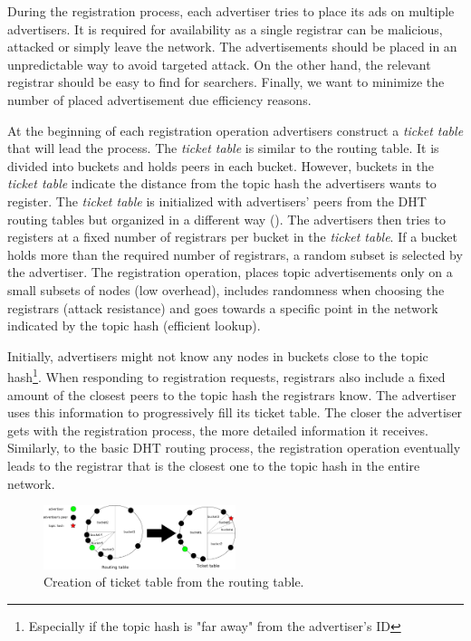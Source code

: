 During the registration process, each advertiser tries to place its ads on multiple advertisers. It is required for availability as a single registrar can be malicious, attacked or simply leave the network. The advertisements should be placed in an unpredictable way to avoid targeted attack. On the other hand, the relevant registrar should be easy to find for searchers. Finally, we want to minimize the number of placed advertisement due efficiency reasons. 

At the beginning of each registration operation advertisers construct a \emph{ticket table} that will lead the process. The \emph{ticket table} is similar to the routing table. It is divided into buckets and holds peers in each bucket. However, buckets in the \emph{ticket table} indicate the distance from the topic hash the advertisers wants to register. The \emph{ticket table} is initialized with advertisers' peers from the DHT routing tables but organized in a different way (). The advertisers then tries to registers at a fixed number of registrars per bucket in the \emph{ticket table}. If a bucket holds more than the required number of registrars, a random subset is selected by the advertiser. The registration operation, places topic advertisements only on a small subsets of nodes (low overhead), includes randomness when choosing the registrars (attack resistance) and goes towards a specific point in the network indicated by the topic hash (efficient lookup).

Initially, advertisers might not know any nodes in buckets close to the topic hash\footnote{Especially if the topic hash is "far away" from the advertiser's ID}. When responding to registration requests, registrars also include a fixed amount of the closest peers to the topic hash the registrars know. The advertiser uses this information to progressively fill its ticket table. The closer the advertiser gets with the registration process, the more detailed information it receives. Similarly, to the basic DHT routing process, the registration operation eventually leads to the registrar that is the closest one to the topic hash in the entire network. 

\begin{figure}
    \includegraphics[width=0.5\textwidth]{img/ticket_table}
    \caption{Creation of ticket table from the routing table.}
    \label{fig:ticket_table}
 \end{figure}

